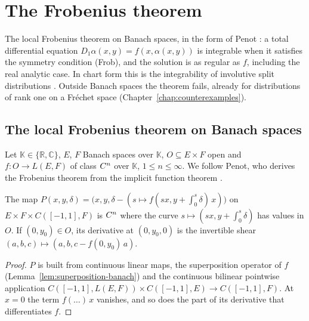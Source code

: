 \chapter{The Frobenius theorem}
\label{chap:frobenius}

The local Frobenius theorem on Banach spaces, in the form of Penot \cite{Pen70}: a total
differential equation $D_1\alpha(x, y) = f(x, \alpha(x, y))$ is integrable when it
satisfies the symmetry condition (Frob), and the solution is as regular as $f$, including the
real analytic case. In chart form this is the integrability of involutive split distributions
\cite[Chapter~VI]{Lan99}. Outside Banach spaces the theorem fails, already for distributions of
rank one on a Fréchet space (Chapter~\ref{chap:counterexamples}).

\section{The local Frobenius theorem on Banach spaces}

Let $\mathbb{K} \in \{\mathbb{R}, \mathbb{C}\}$, $E$, $F$ Banach spaces over $\mathbb{K}$,
$O \subseteq E \times F$ open and $f \colon O \to L(E, F)$ of class $C^{n}$ over $\mathbb{K}$,
$1 \le n \le \infty$. We follow Penot, who derives the Frobenius theorem from the implicit
function theorem \cite[Théorème~1.1]{Pen70}.

\begin{lemma}
  \label{lem:penot-map}
  \leanok
  The map $P(x, y, \delta) = \bigl(x, y, \delta - (s \mapsto f(sx, y + \int_0^s \delta)\,x)\bigr)$
  on $E \times F \times C([-1, 1], F)$ is $C^{n}$ where the curve
  $s \mapsto (sx, y + \int_0^s \delta)$ has values in $O$. If $(0, y_0) \in O$, its derivative at
  $(0, y_0, 0)$ is the invertible shear $(a, b, c) \mapsto (a, b, c - f(0, y_0)\,a)$.
\end{lemma}

\begin{proof}
  \leanok
  $P$ is built from continuous linear maps, the superposition operator of $f$
  (Lemma~\ref{lem:superposition-banach}) and the continuous bilinear pointwise application
  $C([-1,1], L(E, F)) \times C([-1,1], E) \to C([-1,1], F)$. At $x = 0$ the term
  $f(\dots)\,x$ vanishes, and so does the part of its derivative that differentiates $f$.
\end{proof}

